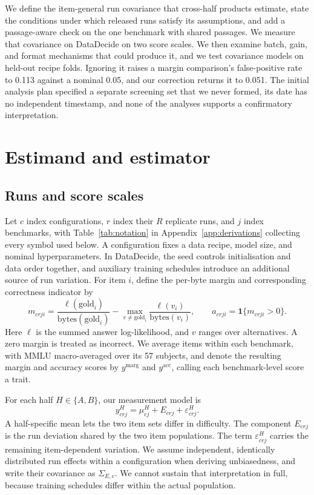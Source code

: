\documentclass{article}
\begin{document}
We define the item-general run covariance that cross-half products estimate, state the conditions under which released runs satisfy its assumptions, and add a passage-aware check on the one benchmark with shared passages. We measure that covariance on DataDecide on two score scales. We then examine batch, gain, and format mechanisms that could produce it, and we test covariance models on held-out recipe folds. Ignoring it raises a margin comparison's false-positive rate to 0.113 against a nominal 0.05, and our correction returns it to 0.051. The initial analysis plan specified a separate screening set that we never formed, its date has no independent timestamp, and none of the analyses supports a confirmatory interpretation.

\section{Estimand and estimator}
\label{sec:estimator}
\subsection{Runs and score scales}
Let $c$ index configurations, $r$ index their $R$ replicate runs, and $j$ index benchmarks, with Table~\ref{tab:notation} in Appendix~\ref{app:derivations} collecting every symbol used below. A configuration fixes a data recipe, model size, and nominal hyperparameters. In DataDecide, the seed controls initialisation and data order together, and auxiliary training schedules introduce an additional source of run variation. For item $i$, define the per-byte margin and corresponding correctness indicator by
\begin{equation}
m_{crji}=\frac{\ell(\mathrm{gold}_i)}{\mathrm{bytes}(\mathrm{gold}_i)}-
\max_{v\ne\mathrm{gold}_i}\frac{\ell(v_i)}{\mathrm{bytes}(v_i)},
\qquad a_{crji}=\mathbf{1}\{m_{crji}>0\}.
\label{eq:scores}
\end{equation}
Here $\ell$ is the summed answer log-likelihood, and $v$ ranges over alternatives. A zero margin is treated as incorrect. We average items within each benchmark, with MMLU macro-averaged over its 57 subjects, and denote the resulting margin and accuracy scores by $y^{\mathrm{marg}}$ and $y^{\mathrm{acc}}$, calling each benchmark-level score a trait.

For each half $H\in\{A,B\}$, our measurement model is
\begin{equation}
y^H_{crj}=\mu^H_{cj}+E_{crj}+\varepsilon^H_{crj}.
\end{equation}
A half-specific mean lets the two item sets differ in difficulty. The component $E_{crj}$ is the run deviation shared by the two item populations. The term $\varepsilon^H_{crj}$ carries the remaining item-dependent variation. We assume independent, identically distributed run effects within a configuration when deriving unbiasedness, and write their covariance as $\Sigma_{E,c}$. We cannot sustain that interpretation in full, because training schedules differ within the actual population.
\end{document}
